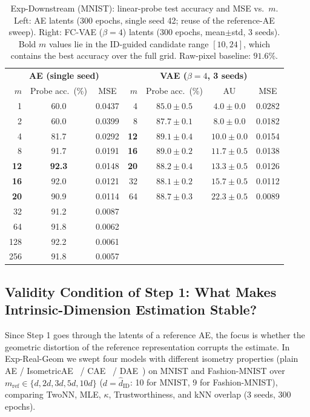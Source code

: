\documentclass[make,article,submit,pdftex,moreauthors]{Definitions/mdpi}
\newcommand{\hatdID}{\hat{d}_{\mathrm{ID}}}
\newcommand{\kap}{\kappa}
\begin{document}
\begin{table}[H]
\caption{Exp-Downstream (MNIST): linear-probe test accuracy and MSE vs.\
$m$. Left: AE latents (300 epochs, single seed 42; reuse of the
reference-AE sweep). Right: FC-VAE ($\beta = 4$) latents (300 epochs,
mean$\pm$std, 3 seeds). Bold $m$ values lie in the ID-guided candidate
range $[10, 24]$, which contains the best accuracy over the full grid.
Raw-pixel baseline: $91.6\%$.}
\label{tab:downstream}
\small
\begin{tabular}{r cc | r ccc}
\toprule
\multicolumn{3}{c|}{\textbf{AE (single seed)}} & \multicolumn{4}{c}{\textbf{VAE ($\beta = 4$, 3 seeds)}} \\
$m$ & Probe acc.\ (\%) & MSE & $m$ & Probe acc.\ (\%) & AU & MSE \\
\midrule
1 & 60.0 & 0.0437 & 4 & $85.0 \pm 0.5$ & $4.0 \pm 0.0$ & 0.0282 \\
2 & 60.0 & 0.0399 & 8 & $87.7 \pm 0.1$ & $8.0 \pm 0.0$ & 0.0182 \\
4 & 81.7 & 0.0292 & \textbf{12} & $\boldsymbol{89.1 \pm 0.4}$ & $10.0 \pm 0.0$ & 0.0154 \\
8 & 91.7 & 0.0191 & \textbf{16} & $89.0 \pm 0.2$ & $11.7 \pm 0.5$ & 0.0138 \\
\textbf{12} & \textbf{92.3} & 0.0148 & \textbf{20} & $88.2 \pm 0.4$ & $13.3 \pm 0.5$ & 0.0126 \\
\textbf{16} & 92.0 & 0.0121 & 32 & $88.1 \pm 0.2$ & $15.7 \pm 0.5$ & 0.0112 \\
\textbf{20} & 90.9 & 0.0114 & 64 & $88.7 \pm 0.3$ & $22.3 \pm 0.5$ & 0.0089 \\
32 & 91.2 & 0.0087 &  & & & \\
64 & 91.8 & 0.0062 &  & & & \\
128 & 92.2 & 0.0061 &  & & & \\
256 & 91.8 & 0.0057 &  & & & \\
\bottomrule
\end{tabular}
\end{table}

\subsection{Validity Condition of Step 1: What Makes Intrinsic-Dimension Estimation Stable?}\label{sec:exp_real_geom}

Since Step 1 goes through the latents of a reference AE, the focus is
whether the geometric distortion of the reference representation corrupts
the estimate.
In Exp-Real-Geom we swept four models with different isometry properties
(plain AE / IsometricAE~\cite{kato2020rdae} / CAE~\cite{rifai2011cae} /
DAE~\cite{alain2014dae}) on MNIST and Fashion-MNIST over
$m_{\mathrm{ref}} \in \{d, 2d, 3d, 5d, 10d\}$
($d = \hatdID$: 10 for MNIST, 9 for Fashion-MNIST), comparing TwoNN, MLE,
$\kap$, Trustworthiness, and kNN overlap (3 seeds, 300 epochs).
\end{document}
